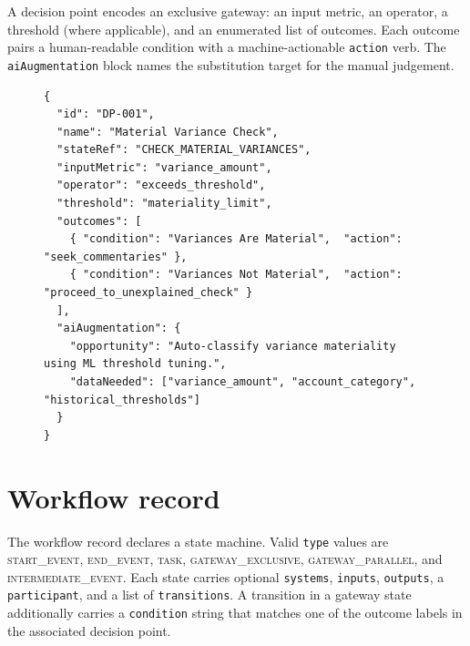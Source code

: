 A decision point encodes an exclusive gateway: an input metric, an
operator, a threshold (where applicable), and an enumerated list of
outcomes. Each outcome pairs a human-readable condition with a
machine-actionable \texttt{action} verb. The \texttt{aiAugmentation}
block names the substitution target for the manual judgement.

\begin{figure}[htbp]
\begin{lstlisting}[language=jsonx,caption={\texttt{DP-001} material
variance gateway.},label=lst:dp-001]
{
  "id": "DP-001",
  "name": "Material Variance Check",
  "stateRef": "CHECK_MATERIAL_VARIANCES",
  "inputMetric": "variance_amount",
  "operator": "exceeds_threshold",
  "threshold": "materiality_limit",
  "outcomes": [
    { "condition": "Variances Are Material",  "action": "seek_commentaries" },
    { "condition": "Variances Not Material",  "action": "proceed_to_unexplained_check" }
  ],
  "aiAugmentation": {
    "opportunity": "Auto-classify variance materiality using ML threshold tuning.",
    "dataNeeded": ["variance_amount", "account_category", "historical_thresholds"]
  }
}
\end{lstlisting}
\end{figure}

\section{Workflow record}\label{sec:workflow-schema}

The workflow record declares a state machine. Valid \texttt{type}
values are \textsc{start\_event}, \textsc{end\_event}, \textsc{task},
\textsc{gateway\_exclusive}, \textsc{gateway\_parallel}, and
\textsc{intermediate\_event}. Each state carries optional
\texttt{systems}, \texttt{inputs}, \texttt{outputs}, a
\texttt{participant}, and a list of \texttt{transitions}. A transition
in a gateway state additionally carries a \texttt{condition} string
that matches one of the outcome labels in the associated decision
point.

